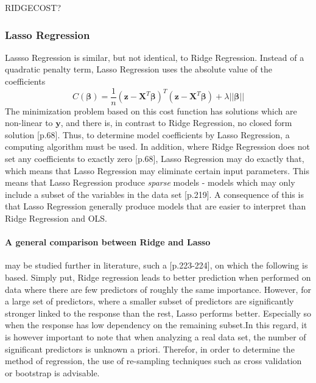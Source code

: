 \documentclass[%
oneside,                 %
final,                   %
10pt]{article}
\begin{document}
RIDGECOST?
\subsubsection{Lasso Regression}
Lassso Regression is similar, but not identical, to Ridge Regression. Instead of a quadratic penalty term, Lasso Regression uses the absolute value of the coefficients \citep{MHJ_LinReg}
\begin{equation}
C(\bm{\beta})=\frac{1}{n}(\bm{z}-\bm{X}^T\bm{\beta})^T(\bm{z}-\bm{X}^T\bm{\beta})+\lambda ||\bm{\beta}||
\label{eq:LassoCost}
\end{equation}
The minimization problem based on this cost function has solutions which are non-linear to $\bm{y}$, and there is, in contrast to Ridge Regression, no closed form solution \citep{HastieTrevor2009TEoS}[p.68]. Thus, to determine model coefficients by Lasso Regression, a computing algorithm must be used. In addition, where Ridge Regression does not set any coefficients to exactly zero \citep{HastieTrevor2009TEoS}[p.68], Lasso Regression may do exactly that, which means that Lasso Regression may eliminate certain input parameters. This means that Lasso Regression produce \textit{sparse} models - models which may only include a subset of the variables in the data set \citep{2017introstatlearn}[p.219]. A consequence of this is that Lasso Regression generally produce models that are easier to interpret than Ridge Regression and OLS. 

\paragraph{A general comparison between Ridge and Lasso} may be studied further in literature, such a \citep{2017introstatlearn}[p.223-224], on which the following is based. Simply put, Ridge regression leads to better prediction when performed on data where there are few predictors of roughly the same importance. However, for a large set of predictors, where a smaller subset of predictors are significantly stronger linked to the response than the rest, Lasso performs better. Especially so when the response has low dependency on the remaining subset.In this regard, it is however important to note that when analyzing a real data set, the number of significant predictors is unknown a priori. Therefor, in order to determine the method of regression, the use of re-sampling techniques such as cross validation or bootstrap is advisable.

 
\end{document}
